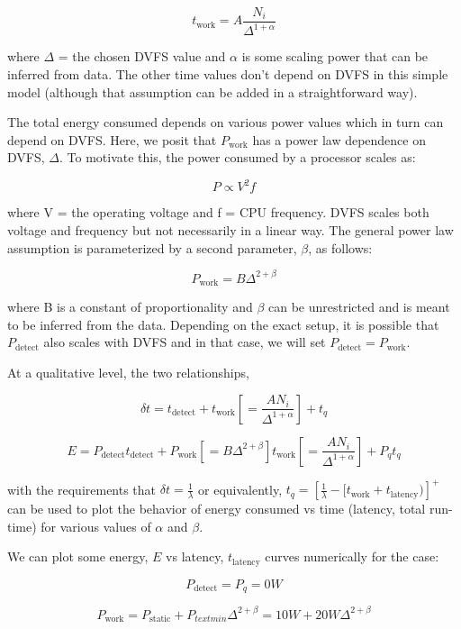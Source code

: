 $$t_{\text{work}} = A\frac{N_i}{\Delta^{1+\alpha}}$$

where $\Delta$ = the chosen DVFS value and $\alpha$ is some scaling power that can be inferred from data. The other time values don't depend on DVFS in this simple model (although that assumption can be added in a straightforward way).

The total energy consumed depends on various power values which in turn can depend on DVFS. Here, we posit that $P_{\text{work}}$ has a power law dependence on DVFS, $\Delta$. To motivate this, the power consumed by a processor scales as:

$$P \propto V^2 f$$

where V = the operating voltage and f = CPU frequency. DVFS scales both voltage and frequency but not necessarily in a linear way. The general power law assumption is parameterized by a second parameter, $\beta$, as follows:

$$P_{\text{work}} = B \Delta^{2+\beta}$$

where B is a constant of proportionality and $\beta$ can be unrestricted and is meant to be inferred from the data. Depending on the exact setup, it is possible that $P_{\text{detect}}$ also scales with DVFS and in that case, we will set $P_{\text{detect}} = P_{\text{work}}$.

At a qualitative level, the two relationships,

\begin{equation}
    \delta t = t_{\text{detect}} + t_{\text{work}} [=\frac{AN_i}{\Delta^{1+\alpha}}] + t_q
\end{equation}

\begin{equation}
    E = P_\text{detect} t_{\text{detect}} + P_{\text{work}}[=B\Delta^{2+\beta}] t_{\text{work}}[=\frac{AN_i}{\Delta^{1+\alpha}}] + P_q t_q
\end{equation}

with the requirements that $\delta t = \frac{1}{\lambda}$ or equivalently, $t_q = \left[\frac{1}{\lambda} - [t_\text{work}+t_\text{latency}) \right]^+$ can be used to plot the behavior of energy consumed vs time (latency, total run-time) for various values of $\alpha$ and $\beta$.

We can plot some energy, $E$ vs latency, $t_{\text{latency}}$ curves numerically for the case:

$$P_{\text{detect}} = P_q = 0W$$

$$P_{\text{work}} = P_{\text{static}} + P_{text{min}} \Delta^{2+\beta} = 10W + 20W \Delta^{2+\beta}$$

